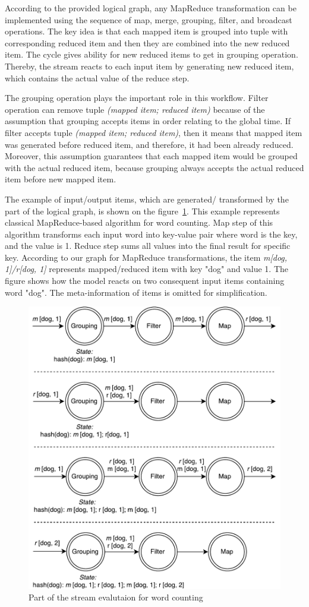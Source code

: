 According to the provided logical graph, any MapReduce transformation can be implemented using the sequence of map, merge, grouping, filter, and broadcast operations. The key idea is that each mapped item is grouped into tuple with corresponding reduced item and then they are combined into the new reduced item. The cycle gives ability for new reduced items to get in grouping operation. Thereby, the stream reacts to each input item by generating new reduced item, which contains the actual value of the reduce step. 

The grouping operation plays the important role in this workflow. Filter operation can remove tuple {\it (mapped item; reduced item)} because of the assumption that grouping accepts items in order relating to the global time. If filter accepts tuple {\it (mapped item; reduced item)}, then it means that mapped item was generated before reduced item, and therefore, it had been already reduced. Moreover, this assumption guarantees that each mapped item would be grouped with the actual reduced item, because grouping always accepts the actual reduced item before new mapped item.

The example of input/output items, which are generated/ transformed by the part of the logical graph, is shown on the figure~\ref {word-count-figure}. This example represents classical MapReduce-based algorithm for word counting. Map step of this algorithm transforms each input word into key-value pair where word is the key, and the value is 1. Reduce step sums all values into the final result for specific key. According to our graph for MapReduce transformations, the item {\it m[dog, 1]/r[dog, 1]} represents mapped/reduced item with key "dog" and value 1. The figure shows how the model reacts on two consequent input items containing word "dog". The meta-information of items is omitted for simplification.

\begin{figure}[htb]
  \centering
  \includegraphics[scale=0.5]{pics/wordcount}
  \caption{Part of the stream evalutaion for word counting}
  \label {word-count-figure}
\end{figure}

